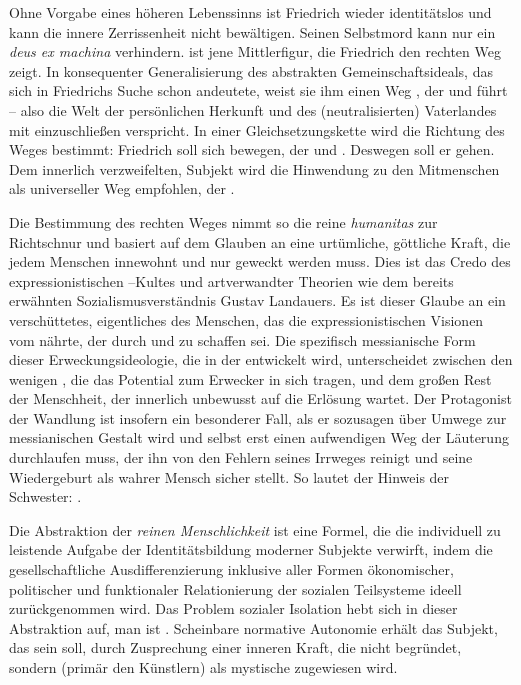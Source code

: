 Ohne Vorgabe eines höheren Lebenssinns ist Friedrich wieder identitätslos und
kann die innere Zerrissenheit nicht bewältigen. Seinen Selbstmord kann
nur ein \emph{deus ex machina} verhindern. \Cite{Die Schwester} ist jene
Mittlerfigur, die Friedrich den rechten Weg zeigt. In konsequenter
Generalisierung des abstrakten Gemeinschaftsideals, das sich in Friedrichs
Suche schon andeutete, weist sie ihm einen Weg \Cite{hinauf}, der \Cite{auch
  zur Mutter} und \Cite{auch zu deinem Land} führt  -- also
die Welt der
persönlichen Herkunft und des (neutralisierten) Vaterlandes mit einzuschließen
verspricht.  In einer Gleichsetzungskette wird die Richtung des Weges
bestimmt: Friedrich soll sich \Cite{zu Gott} bewegen, der \Cite{Geist und
  Liebe und Kraft ist} und \Cite{in der Menschheit lebt}. Deswegen soll er
\Cite{zu den Menschen} gehen. Dem innerlich verzweifelten, \Cite{heimatlosen}
Subjekt wird die Hinwendung zu den Mitmenschen als universeller Weg empfohlen,
der \Cite{isolierte Held kann nur durch die Erlösung der ganzen Welt seine
  eigene erwirken}.

Die Bestimmung des rechten Weges nimmt so die reine \emph{humanitas} zur
Richtschnur und basiert auf dem Glauben an eine urtümliche, göttliche Kraft,
die jedem Menschen innewohnt und nur geweckt werden muss. Dies ist das Credo
des expressionistischen --Kultes und artverwandter Theorien wie
dem bereits erwähnten Sozialismusverständnis Gustav Landauers. Es ist dieser
Glaube an ein verschüttetes, eigentliches  des Menschen, das die
expressionistischen Visionen vom  nährte, der durch
\Cite{Wiedergeburt} und \Cite{Erweckung} zu schaffen sei.  Die
spezifisch messianische Form dieser Erweckungsideologie, die in der
 entwickelt wird, unterscheidet zwischen den wenigen
, die das Potential zum Erwecker in sich tragen, und dem
großen Rest der Menschheit, der innerlich unbewusst auf die Erlösung wartet.
Der Protagonist der Wandlung ist insofern ein besonderer Fall, als er
sozusagen über Umwege zur messianischen Gestalt wird und selbst erst einen
aufwendigen Weg der Läuterung durchlaufen muss, der ihn von den Fehlern seines
Irrweges reinigt und seine Wiedergeburt als wahrer Mensch sicher stellt.  So
lautet der Hinweis der Schwester: \Cite{Wer zu den Menschen gehen will, muss
  erst in sich den Menschen finden.} .

Die Abstraktion der \emph{reinen Menschlichkeit} ist eine Formel, die die
individuell zu leistende Aufgabe der Identitätsbildung moderner Subjekte
verwirft, indem die gesellschaftliche Ausdifferenzierung inklusive
aller Formen ökonomischer, politischer und funktionaler Relationierung der
sozialen Teilsysteme ideell zurückgenommen wird.  Das Problem sozialer
Isolation hebt sich in dieser Abstraktion auf, man ist \Cite{allein, und doch
  mit allen} .  Scheinbare normative Autonomie erhält das
Subjekt, das \Cite{selber Angeklagter, selber Richter} sein
soll, durch Zusprechung einer inneren Kraft, die nicht begründet, sondern
(primär den Künstlern) als mystische  zugewiesen wird.

